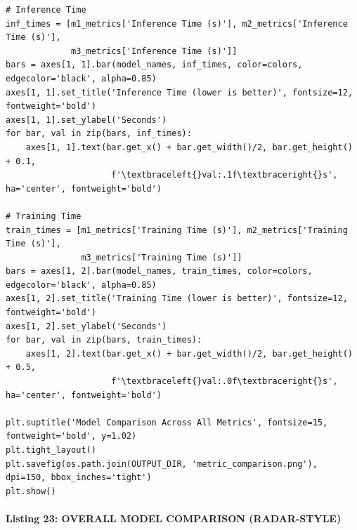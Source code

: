 \documentclass[12pt,a4paper,oneside]{report}
\begin{document}
\begin{Verbatim}[commandchars=\\\{\},breaklines=true,breakanywhere=true,fontsize=\scriptsize,frame=leftline,framesep=2mm,rulecolor=\color{gray}]
# Inference Time
inf_times = [m1_metrics['Inference Time (s)'], m2_metrics['Inference Time (s)'],
             m3_metrics['Inference Time (s)']]
bars = axes[1, 1].bar(model_names, inf_times, color=colors, edgecolor='black', alpha=0.85)
axes[1, 1].set_title('Inference Time (lower is better)', fontsize=12, fontweight='bold')
axes[1, 1].set_ylabel('Seconds')
for bar, val in zip(bars, inf_times):
    axes[1, 1].text(bar.get_x() + bar.get_width()/2, bar.get_height() + 0.1,
                     f'\textbraceleft{}val:.1f\textbraceright{}s', ha='center', fontweight='bold')

# Training Time
train_times = [m1_metrics['Training Time (s)'], m2_metrics['Training Time (s)'],
               m3_metrics['Training Time (s)']]
bars = axes[1, 2].bar(model_names, train_times, color=colors, edgecolor='black', alpha=0.85)
axes[1, 2].set_title('Training Time (lower is better)', fontsize=12, fontweight='bold')
axes[1, 2].set_ylabel('Seconds')
for bar, val in zip(bars, train_times):
    axes[1, 2].text(bar.get_x() + bar.get_width()/2, bar.get_height() + 0.5,
                     f'\textbraceleft{}val:.0f\textbraceright{}s', ha='center', fontweight='bold')

plt.suptitle('Model Comparison Across All Metrics', fontsize=15, fontweight='bold', y=1.02)
plt.tight_layout()
plt.savefig(os.path.join(OUTPUT_DIR, 'metric_comparison.png'), dpi=150, bbox_inches='tight')
plt.show()
\end{Verbatim}
\paragraph{Listing 23: OVERALL MODEL COMPARISON (RADAR-STYLE)}\mbox{}\\[-1ex]
\end{document}
